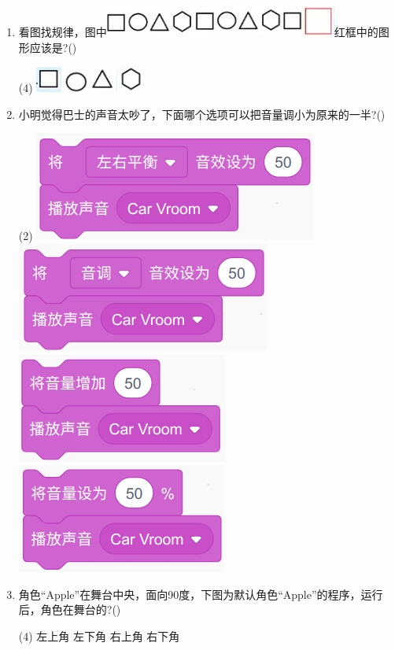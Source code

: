 \documentclass[10pt, a4paper]{article}
\begin{document}
\begin{enumerate}
        \item 看图找规律，图中\includegraphics[width=.2\textwidth]{13.jpg}红框中的图形应该是?(\qquad)
        \begin{tasks}(4)
            \task \includegraphics[width=.03\textwidth]{13a.jpg}
            \task \includegraphics[width=.03\textwidth]{13b.jpg}
            \task \includegraphics[width=.03\textwidth]{13c.jpg}
            \task \includegraphics[width=.03\textwidth]{13d.jpg}
        \end{tasks}

        \item 小明觉得巴士的声音太吵了，下面哪个选项可以把音量调小为原来的一半?(\qquad)
        \begin{tasks}(2)
            \task \includegraphics[width=.25\textwidth]{14a.png}
            \task \includegraphics[width=.25\textwidth]{14b.png}
            \task \includegraphics[width=.18\textwidth]{14c.png}
            \task \includegraphics[width=.18\textwidth]{14d.png}
        \end{tasks}
    
        \newpage
        \item 角色“Apple”在舞台中央，面向90度，下图为默认角色“Apple”的程序，运行后，角色在舞台的?(\qquad)
        \begin{tasks}(4)
            \task 左上角
            \task 左下角
            \task 右上角
            \task 右下角
        \end{tasks}


\end{enumerate}
\end{document}
